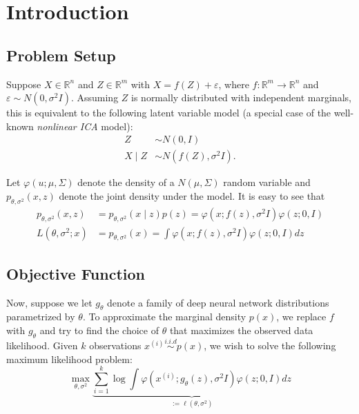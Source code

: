 \section{Introduction}
\subsection{Problem Setup}
Suppose $X \in \mathbb{R}^{n}$ and $Z \in \mathbb{R}^{m}$ with $X=f(Z)+\varepsilon$, where $f: \mathbb{R}^{m} \rightarrow \mathbb{R}^{n}$ and $\varepsilon \sim N\left(0, \sigma^{2} I\right)$. Assuming $Z$ is normally distributed with independent marginals, this is equivalent to the following latent variable model (a special case of the well-known \textit{nonlinear ICA} model):
\begin{equation*}
\begin{aligned}
Z & \sim N\left(0, I\right) \\
X \mid Z & \sim N\left(f(Z), \sigma^{2} I\right) .
\end{aligned}
\end{equation*}

Let $\varphi(u ; \mu, \Sigma)$ denote the density of a $N(\mu, \Sigma)$ random variable and $p_{\theta, \sigma^{2}}(x, z)$ denote the joint density under the model. It is easy to see that
\begin{equation*}
\begin{aligned}
p_{\theta, \sigma^{2}}\left(x, z\right) &=p_{\theta, \sigma^{2}} \left(x \mid z\right) p(z)=\varphi\left(x ; f(z), \sigma^{2} I\right) \varphi(z ; 0, I) \\
L \left(\theta, \sigma^{2} ; x\right) &= p_{\theta, \sigma^{2}}\left(x\right) =\int \varphi\left(x ; f(z), \sigma^{2} I\right) \varphi(z ; 0, I) dz
\end{aligned}
\end{equation*}

\subsection{Objective Function}
Now, suppose we let $g_{\theta}$ denote a family of deep neural network distributions parametrized by $\theta$. To approximate the marginal density $p(x)$, we replace $f$ with $g_{\theta}$ and try to find the choice of $\theta$ that maximizes the observed data likelihood. Given $k$ observations $x^{(i)} \stackrel{i.i.d}{\sim} p(x)$, we wish to solve the following maximum likelihood problem:
\begin{equation*}
\max_{\theta, \sigma^{2}} \underbrace{\sum_{i=1}^{k} \log \int \varphi\left(x^{(i)} ; g_{\theta}(z), \sigma^{2} I\right) \varphi(z ; 0, I) dz}_{:=\ell(\theta, \sigma^{2})}
\end{equation*}

